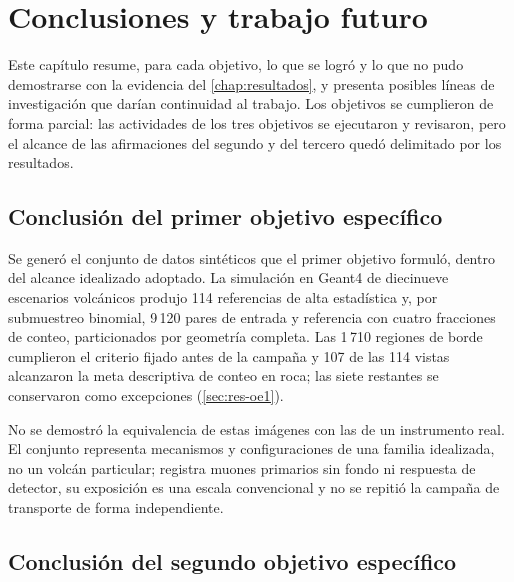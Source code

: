 \chapter{Conclusiones y trabajo futuro}
\label{chap:conclusiones}

Este capítulo resume, para cada objetivo, lo que se logró y lo que no pudo demostrarse con la evidencia del \cref{chap:resultados}, y presenta posibles líneas de investigación que darían continuidad al trabajo. Los objetivos se cumplieron de forma parcial: las actividades de los tres objetivos se ejecutaron y revisaron, pero el alcance de las afirmaciones del segundo y del tercero quedó delimitado por los resultados.

\section{Conclusión del primer objetivo específico}
\label{sec:conc-oe1}

Se generó el conjunto de datos sintéticos que el primer objetivo formuló, dentro del alcance idealizado adoptado. La simulación en Geant4 de diecinueve escenarios volcánicos produjo 114 referencias de alta estadística y, por submuestreo binomial, 9\,120 pares de entrada y referencia con cuatro fracciones de conteo, particionados por geometría completa. Las 1\,710 regiones de borde cumplieron el criterio fijado antes de la campaña y 107 de las 114 vistas alcanzaron la meta descriptiva de conteo en roca; las siete restantes se conservaron como excepciones (\cref{sec:res-oe1}).

No se demostró la equivalencia de estas imágenes con las de un instrumento real. El conjunto representa mecanismos y configuraciones de una familia idealizada, no un volcán particular; registra muones primarios sin fondo ni respuesta de detector, su exposición es una escala convencional y no se repitió la campaña de transporte de forma independiente.

\section{Conclusión del segundo objetivo específico}
\label{sec:conc-oe2}

